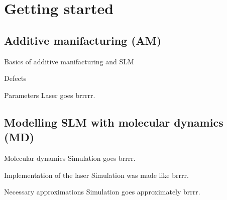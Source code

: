 \section{Getting started}


\subsection{Additive manifacturing (AM)}
\begin{frame}{Basics of additive manifacturing and SLM}
	\missing
\end{frame}


\begin{frame}{Defects}
	\missing
\end{frame}


\begin{frame}{Parameters}
	\missing Laser goes brrrrr.
\end{frame}


\subsection{Modelling SLM with molecular dynamics (MD)}
\begin{frame}{Molecular dynamics}
	\missing Simulation goes brrrr.
\end{frame}


\begin{frame}{Implementation of the laser}
	\missing Simulation was made like brrrr.
\end{frame}


\begin{frame}{Necessary approximations}
	\missing Simulation goes approximately brrrr.
\end{frame}

